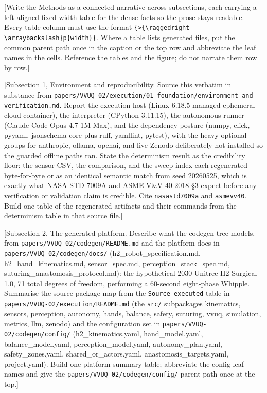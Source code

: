 
[Write the Methods as a connected narrative across subsections, each carrying a
left-aligned fixed-width table for the dense facts so the prose stays readable.
Every table column must use the format \texttt{\{>\{\textbackslash raggedright
\textbackslash arraybackslash\}p\{width\}\}}. Where a table lists generated files,
put the common parent path once in the caption or the top row and abbreviate the
leaf names in the cells. Reference the tables and the figure; do not narrate them
row by row.]

[Subsection 1, Environment and reproducibility. Source this verbatim in substance
from \texttt{papers/VVUQ-02/execution/01-foundation/environment-and-verification.md}.
Report the execution host (Linux 6.18.5 managed ephemeral cloud container), the
interpreter (CPython 3.11.15), the autonomous runner (Claude Code Opus 4.7 1M Max),
and the dependency posture (numpy, click, pyyaml, jsonschema core plus ruff,
yamllint, pytest), with the heavy optional groups for anthropic, ollama, openai,
and live Zenodo deliberately not installed so the guarded offline paths ran. State
the determinism result as the credibility floor: the sensor CSV, the comparison,
and the sweep index each regenerated byte-for-byte or as an identical semantic
match from seed 20260525, which is exactly what NASA-STD-7009A and ASME V\&V 40-2018
§3 expect before any verification or validation claim is credible. Cite
\texttt{nasastd7009a} and \texttt{asmevv40}. Build one table of the regenerated
artifacts and their commands from the determinism table in that source file.]

[Subsection 2, The generated platform. Describe what the codegen tree models, from
\texttt{papers/VVUQ-02/codegen/README.md} and the platform docs in
\texttt{papers/VVUQ-02/codegen/docs/} (h2\_robot\_specification.md,
h2\_hand\_kinematics.md, sensor\_spec.md, perception\_stack\_spec.md,
suturing\_anastomosis\_protocol.md): the hypothetical 2030 Unitree H2-Surgical 1.0,
71 total degrees of freedom, performing a 60-second eight-phase Whipple. Summarise
the source package map from the \texttt{Source executed} table in
\texttt{papers/VVUQ-02/execution/README.md} (the \texttt{src/} subpackages
kinematics, sensors, perception, autonomy, hands, balance, safety, suturing, vvuq,
simulation, metrics, llm, zenodo) and the configuration set in
\texttt{papers/VVUQ-02/codegen/config/} (h2\_kinematics.yaml, hand\_model.yaml,
balance\_model.yaml, perception\_model.yaml, autonomy\_plan.yaml,
safety\_zones.yaml, shared\_or\_actors.yaml, anastomosis\_targets.yaml,
project.yaml). Build one platform-summary table; abbreviate the config leaf names
and give the \texttt{papers/VVUQ-02/codegen/config/} parent path once at the top.]

